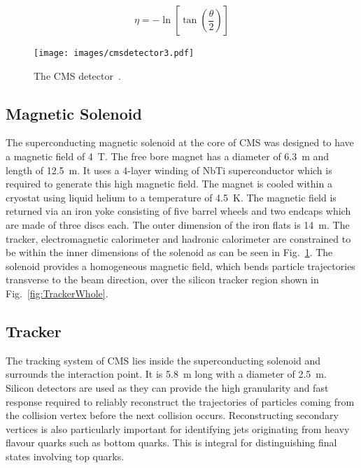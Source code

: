 \begin{equation}
    \eta = - \ln \left[ \tan \left(\frac{\theta}{2} \right) \right]
    \label{eqn:eta}
\end{equation}

\begin{figure}[ht!]
\centering
    \texttt{[image: images/cmsdetector3.pdf]}
    \caption{The CMS detector~\cite{1742-6596-513-2-022032}.}
    \label{fig:CMSdetector}
\end{figure}


\subsection{Magnetic Solenoid}

The superconducting magnetic solenoid at the core of CMS was designed to have a magnetic field of 4~T. The free bore magnet has a diameter of 6.3~m and length of 12.5~m. It uses a 4-layer winding of NbTi superconductor which is required to generate this high magnetic field. The magnet is cooled within a cryostat using liquid helium to a temperature of 4.5~K. The magnetic field is returned via an iron yoke consisting of five barrel wheels and two endcaps which are made of three discs each. The outer dimension of the iron flats is 14~m. The tracker, electromagnetic calorimeter and hadronic calorimeter are constrained to be within the inner dimensions of the solenoid as can be seen in Fig.~\ref{fig:CMSdetector}. The solenoid provides a homogeneous magnetic field, which bends particle trajectories transverse to the beam direction, over the silicon tracker region shown in Fig.~\ref{fig:TrackerWhole}.

\subsection{Tracker \label{sec:tracker}}

The tracking system of CMS lies inside the superconducting solenoid and surrounds the interaction point. It is 5.8~m long with a diameter of 2.5~m.
Silicon detectors are used as they can provide the high granularity and fast response required to reliably reconstruct the trajectories of particles coming from the collision vertex before the next collision occurs.
Reconstructing secondary vertices is also particularly important for identifying jets originating from heavy flavour quarks such as bottom quarks. This is integral for distinguishing final states involving top quarks.

